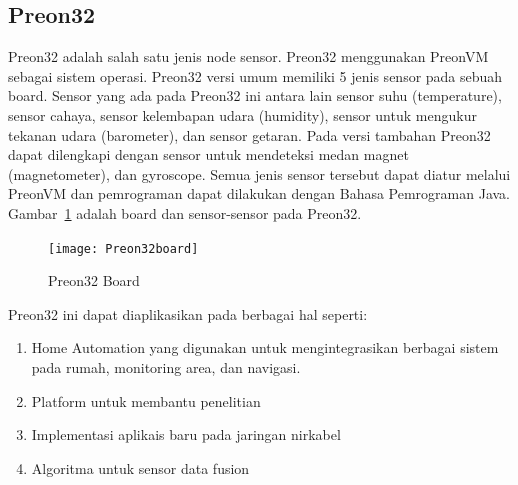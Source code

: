 \subsection{Preon32}
Preon32 adalah salah satu jenis node sensor. Preon32 menggunakan PreonVM sebagai sistem operasi. Preon32 versi umum memiliki 5 jenis sensor pada sebuah board. Sensor yang ada pada Preon32 ini antara lain sensor suhu (temperature), sensor cahaya, sensor kelembapan udara (humidity), sensor untuk mengukur tekanan udara (barometer), dan sensor getaran. Pada versi tambahan Preon32 dapat dilengkapi dengan sensor untuk mendeteksi medan magnet (magnetometer), dan gyroscope. Semua jenis sensor tersebut dapat diatur melalui PreonVM dan pemrograman dapat dilakukan dengan Bahasa Pemrograman Java. Gambar~\ref{fig:Preon32board} adalah board dan sensor-sensor pada Preon32.
\begin{figure} [H]
	\centering  
	\texttt{[image: Preon32board]}  
	\caption[Preon32 Board]{Preon32 Board} 
	\label{fig:Preon32board} 
\end{figure} 

Preon32 ini dapat diaplikasikan pada berbagai hal seperti:
\begin{enumerate}
	\item Home Automation yang digunakan untuk mengintegrasikan berbagai sistem pada rumah, monitoring area, dan navigasi.  
	\item Platform untuk membantu penelitian
	\item Implementasi aplikais baru pada jaringan nirkabel
	\item Algoritma untuk sensor data fusion
\end{enumerate}


